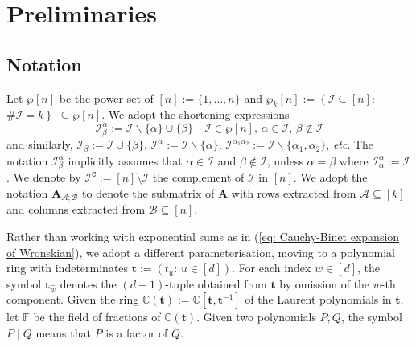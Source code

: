 \documentclass[10pt]{article}
\theoremstyle{remark}%
\theoremstyle{definition}%
\begin{document}
\section{\label{sec: Preliminaries} Preliminaries}

\subsection{\label{subsec: Notation} Notation }

Let $\wp[n]$ be the power set of $[n]:=\{1,\dots,n\}$ and
$\wp_{k}[n]:=\left\{\mathcal{I}\subseteq[n]:\right.$ $\left.\#\mathcal{I}=k\right\}$ $\subseteq\wp[n]$. We adopt the shortening expressions 
 \begin{equation}
\mathcal{I}_{\beta}^{\alpha}:=\mathcal{I}\backslash\{\alpha\}\cup\{\beta\}\quad\mathcal{I}\in\wp[n],\,\alpha\in\mathcal{I},\,\beta\notin\mathcal{I}\label{eq: 1-exchange}
 \end{equation}
and similarly, $\mathcal{I}_{\beta}:=\mathcal{I}\cup\{\beta\}$, $\mathcal{I}^{\alpha}:=\mathcal{I}\backslash\{\alpha\}$, $\mathcal{I}^{\alpha_{1}\alpha_{2}}:=\mathcal{I}\backslash\{\alpha_{1},\alpha_{2}\}$, \textit{etc}. The notation $\mathcal{I}_{\beta}^{\alpha}$ implicitly assumes that $\alpha\in\mathcal{I}$ and $\beta\notin\mathcal{I}$, unless $\alpha=\beta$ where $\mathcal{I}_{\alpha}^{\alpha}:=\mathcal{I}$. We denote by $\mathcal{I}^{\mathtt{C}}:=[n]\setminus\mathcal{I}$ the complement of $\mathcal{I}$ in $[n]$. %
We adopt the notation $\mathbf{A}_{\mathcal{A};\mathcal{B}}$
to denote the submatrix of $\mathbf{A}$ with rows extracted from $\mathcal{A}\subseteq[k]$ and columns extracted from $\mathcal{B}\subseteq[n]$.

Rather than working with exponential sums as in (\ref{eq: Cauchy-Binet expansion of Wronskian}), we adopt a different parameterisation, moving to a polynomial ring with indeterminates $\mathbf{t}:=(t_{u}:\,u\in [d])$. 
For each index $w\in [d]$, the symbol $\mathbf{t}_{\widehat{w}}$ denotes the $(d-1)$-tuple obtained from $\mathbf{t}$ by omission of the $w$-th component. Given the ring $\mathbb{C}(\mathbf{t}):=\mathbb{C}[\mathbf{t},\mathbf{t}^{-1}]$ of the Laurent polynomials in $\mathbf{t}$, let $\mathbb{F}$ be the field of fractions of $\mathbb{C}(\mathbf{t})$. Given two polynomials $P,Q$, the symbol $P\mid Q$ means that $P$ is a factor of $Q$. 
\end{document}
